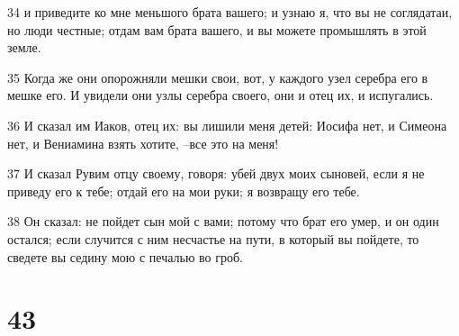 \par 34 и приведите ко мне меньшого брата вашего; и узнаю я, что вы не соглядатаи, но люди честные; отдам вам брата вашего, и вы можете промышлять в этой земле.
\par 35 Когда же они опорожняли мешки свои, вот, у каждого узел серебра его в мешке его. И увидели они узлы серебра своего, они и отец их, и испугались.
\par 36 И сказал им Иаков, отец их: вы лишили меня детей: Иосифа нет, и Симеона нет, и Вениамина взять хотите, --все это на меня!
\par 37 И сказал Рувим отцу своему, говоря: убей двух моих сыновей, если я не приведу его к тебе; отдай его на мои руки; я возвращу его тебе.
\par 38 Он сказал: не пойдет сын мой с вами; потому что брат его умер, и он один остался; если случится с ним несчастье на пути, в который вы пойдете, то сведете вы седину мою с печалью во гроб.

\chapter{43}

